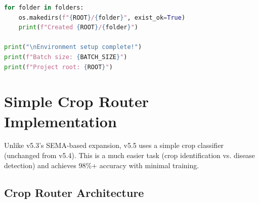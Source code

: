 \documentclass[11pt,a4paper]{article}
\begin{document}
\begin{lstlisting}[language=Python, caption={Environment Setup for v5.5}]
for folder in folders:
    os.makedirs(f"{ROOT}/{folder}", exist_ok=True)
    print(f"Created {ROOT}/{folder}")

print("\nEnvironment setup complete!")
print(f"Batch size: {BATCH_SIZE}")
print(f"Project root: {ROOT}")
\end{lstlisting}

\section{Simple Crop Router Implementation}

Unlike v5.3's SEMA-based expansion, v5.5 uses a simple crop classifier (unchanged from v5.4). This is a much easier task (crop identification vs. disease detection) and achieves 98\%+ accuracy with minimal training.

\subsection{Crop Router Architecture}
\end{document}
